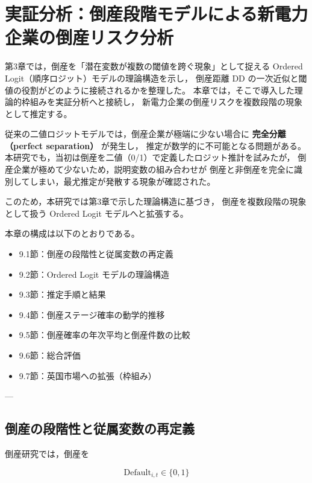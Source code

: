\chapter{実証分析：倒産段階モデルによる新電力企業の倒産リスク分析}
\label{chap:ordered_logit_analysis}

第3章では，倒産を「潜在変数が複数の閾値を跨ぐ現象」として捉える
Ordered Logit（順序ロジット）モデルの理論構造を示し，
倒産距離 DD の一次近似と閾値の役割がどのように接続されるかを整理した。
本章では，そこで導入した理論的枠組みを実証分析へと接続し，
新電力企業の倒産リスクを複数段階の現象として推定する。

従来の二値ロジットモデルでは，倒産企業が極端に少ない場合に
\textbf{完全分離（perfect separation）} が発生し，
推定が数学的に不可能となる問題がある。
本研究でも，当初は倒産を二値（0/1）で定義したロジット推計を試みたが，
倒産企業が極めて少ないため，説明変数の組み合わせが
倒産と非倒産を完全に識別してしまい，最尤推定が発散する現象が確認された。

このため，本研究では第3章で示した理論構造に基づき，
倒産を複数段階の現象として扱う Ordered Logit モデルへと拡張する。

本章の構成は以下のとおりである。

\begin{itemize}
    \item 9.1節：倒産の段階性と従属変数の再定義
    \item 9.2節：Ordered Logit モデルの理論構造
    \item 9.3節：推定手順と結果
    \item 9.4節：倒産ステージ確率の動学的推移
    \item 9.5節：倒産確率の年次平均と倒産件数の比較
    \item 9.6節：総合評価
    \item 9.7節：英国市場への拡張（枠組み）
\end{itemize}

---


\section{倒産の段階性と従属変数の再定義}

倒産研究では，倒産を



\[
\text{Default}_{i,t} \in \{0,1\}
\]



